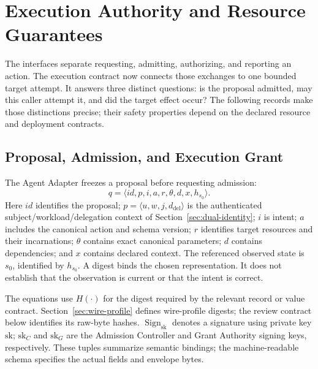 \section{Execution Authority and Resource Guarantees}
\label{sec:execution}

The interfaces separate requesting, admitting, authorizing, and reporting an action. The execution contract now connects those exchanges to one bounded target attempt. It answers three distinct questions: is the proposal admitted, may this caller attempt it, and did the target effect occur? The following records make those distinctions precise; their safety properties depend on the declared resource and deployment contracts.

\subsection{Proposal, Admission, and Execution Grant}
The Agent Adapter freezes a proposal before requesting admission:
\begin{equation}
q = \langle id, p, i, a, r, \theta, d, x, h_{s_0} \rangle .
\label{eq:proposal-def}
\end{equation}
Here $id$ identifies the proposal; $p=\langle u,w,j,d_{\mathrm{del}}\rangle$ is the authenticated subject/workload/delegation context of Section~\ref{sec:dual-identity}; $i$ is intent; $a$ includes the canonical action and schema version; $r$ identifies target resources and their incarnations; $\theta$ contains exact canonical parameters; $d$ contains dependencies; and $x$ contains declared context. The referenced observed state is $s_0$, identified by $h_{s_0}$. A digest binds the chosen representation. It does not establish that the observation is current or that the intent is correct.

The equations use $H(\cdot)$ for the digest required by the relevant record or value contract. Section~\ref{sec:wire-profile} defines wire-profile digests; the review contract below identifies its raw-byte hashes. $\operatorname{Sign}_{\mathrm{sk}}$ denotes a signature using private key $\mathrm{sk}$; $\mathrm{sk}_C$ and $\mathrm{sk}_G$ are the Admission Controller and Grant Authority signing keys, respectively. These tuples summarize semantic bindings; the machine-readable schema specifies the actual fields and envelope bytes.

